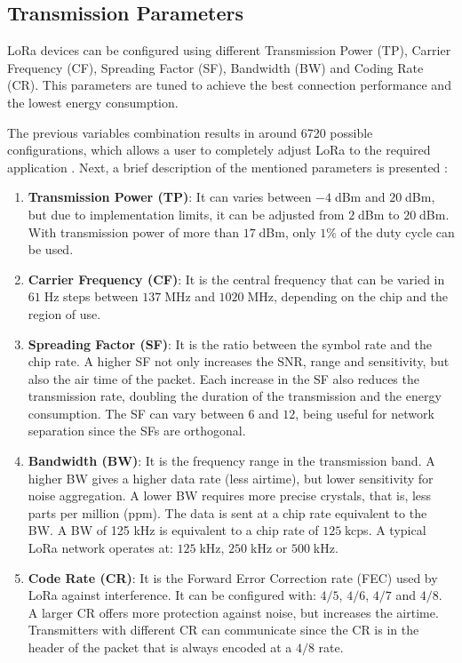 
\subsection{Transmission Parameters}

LoRa devices can be configured using different Transmission Power (TP), Carrier Frequency (CF), Spreading Factor (SF), Bandwidth (BW) and Coding Rate (CR). This parameters are tuned to achieve the best connection performance and the lowest energy consumption.

The previous variables combination results in around 6720 possible configurations, which allows a user to completely adjust LoRa to the required application \cite{Bor2017}. Next, a brief description of the mentioned parameters is presented \cite{C}:

\begin{enumerate}

\item \textbf{Transmission Power (TP)}: It can varies between $-4\;$dBm and $20\;$dBm, but due to implementation limits, it can be adjusted from $2\;$dBm to $20\;$dBm. With transmission power of more than $17\;$dBm, only $1\%$ of the duty cycle can be used.
\item \textbf{Carrier Frequency (CF)}: It is the central frequency that can be varied in $61\;$Hz steps between $137\;$MHz and $1020\;$MHz, depending on the chip and the region of use.
\item \textbf{Spreading Factor (SF)}: It is the ratio between the symbol rate and the chip rate. A higher SF not only increases the SNR, range and sensitivity, but also the air time of the packet. Each increase in the SF also reduces the transmission rate, doubling the duration of the transmission and the energy consumption. The SF can vary between $6$ and $12$, being useful for network separation since the SFs are orthogonal.

\item \textbf {Bandwidth (BW)}: It is the frequency range in the transmission band. A higher BW gives a higher data rate (less airtime), but lower sensitivity for noise aggregation. A lower BW requires more precise crystals, that is, less parts per million (ppm). The data is sent at a chip rate equivalent to the BW. A BW of 125 kHz is equivalent to a chip rate of $125\;$kcps. A typical LoRa network operates at: $125\;$kHz, $250\;$kHz or $500\;$kHz.

\item \textbf {Code Rate (CR)}: It is the Forward Error Correction rate (FEC) used by LoRa against interference. It can be configured with: $4/5$, $4/6$, $4/7$ and $4/8$. A larger CR offers more protection against noise, but increases the airtime. Transmitters with different CR can communicate since the CR is in the header of the packet that is always encoded at a $4/8$ rate.

\end{enumerate}

